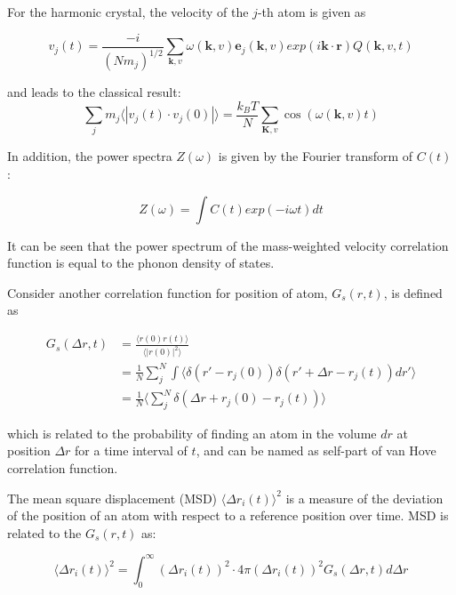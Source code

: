 \documentclass[twoside,twocolumn,9pt]{article}
\begin{document}
For  the harmonic crystal, the velocity of the $j$-th atom is given as

\begin{equation}
v_j(t)=\frac{-i}{(Nm_j)^{1/2}}\sum_{\textbf{k},v}\omega(\textbf{k},v)\textbf{e}_j(\textbf{k},v)exp(i\textbf{k}\cdot \textbf{r})Q(\textbf{k},v,t)
\end{equation}

and leads to the classical result:
\begin{equation}
\sum_j  m_j \langle |v_j(t)\cdot v_j(0) |\rangle = \frac{k_B T}{N}\sum_{\textbf{K},v}\cos (\omega(\textbf{k}, v)t)
\end{equation}

In addition, the power spectra $Z(\omega)$ is given by the Fourier transform of $C(t)$:

\begin{equation}
Z(\omega)=\int C(t)exp(-i\omega t)dt
\end{equation}

It can be seen that the power spectrum of the mass-weighted velocity correlation function is equal to the phonon density of states.

Consider another correlation function for position of atom, $G_s(r,t)$, is defined as

\begin{align*}
G_s(\Delta r,t)&=\frac{\langle r(0)r(t)\rangle}{\langle | r(0)|^2 \rangle} \\
        &=\frac{1}{N}\sum_{j}^{N}\int \langle \delta(r'-r_j(0))\delta(r'+\Delta r -r_j(t))dr' \rangle \\
        &=\frac{1}{N}\langle \sum_{j}^{N}\delta(\Delta r +r_j(0)-r_j(t))\rangle
\end{align*}

which is related to the probability of finding an atom in the volume $dr$ at position $\Delta r$ for a time interval of $t$,
and can be named as self-part of van Hove correlation function.

The mean square displacement (MSD) $\langle \Delta r_i(t)\rangle ^2$  is a measure of the deviation of the position of an atom with
respect to a reference position over time. MSD is related to the $G_s(r,t)$ as:

\begin{equation}
  \langle \Delta r_i(t)\rangle ^2=\int_{0}^{\infty} (\Delta r_i(t))^2\cdot 4\pi(\Delta r_i(t))^2G_s(\Delta r,t)d\Delta r
\end{equation}
\end{document}
